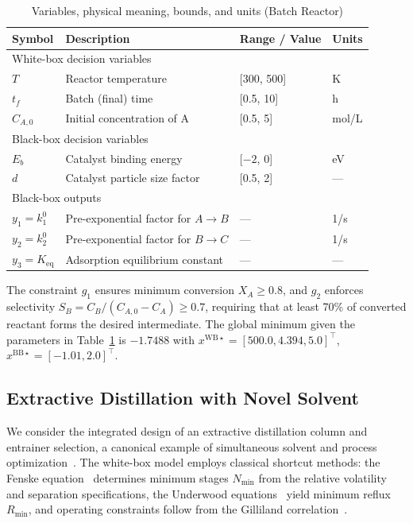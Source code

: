 \documentclass[12pt,a4paper]{article}%
\theoremstyle{plain}%
\theoremstyle{remark}%
\theoremstyle{definition}%
\def\WB{\mathrm{WB}}
\def\BB{\mathrm{BB}}
\begin{document}
\begin{appendices}
\begin{table}[htbp]
\centering
\caption{Variables, physical meaning, bounds, and units (Batch Reactor)}
\label{tab:batch_reactor_vars}
\begin{tabular}{@{}llll@{}}
\toprule
\textbf{Symbol} & \textbf{Description} & \textbf{Range / Value} & \textbf{Units} \\
\midrule
\multicolumn{4}{l}{White-box decision variables} \\
\midrule
$T$ & Reactor temperature & [300, 500] & K \\
$t_f$ & Batch (final) time & [0.5, 10] & h \\
$C_{A,0}$ & Initial concentration of A & [0.5, 5] & mol/L \\
\midrule
\multicolumn{4}{l}{Black-box decision variables} \\
\midrule
$E_b$ & Catalyst binding energy & [$-2$, 0] & eV \\
$d$ & Catalyst particle size factor & [0.5, 2] & --- \\
\midrule
\multicolumn{4}{l}{Black-box outputs} \\
\midrule
$y_1 = k_1^0$ & Pre-exponential factor for $A \to B$ & --- & 1/s \\
$y_2 = k_2^0$ & Pre-exponential factor for $B \to C$ & --- & 1/s \\
$y_3 = K_{\text{eq}}$ & Adsorption equilibrium constant & --- & --- \\
\bottomrule
\end{tabular}
\end{table}

The constraint $g_1$ ensures minimum conversion $X_A \geq 0.8$, and $g_2$ enforces selectivity $S_B = C_B/(C_{A,0} - C_A) \geq 0.7$, requiring that at least 70\% of converted reactant forms the desired intermediate. The global minimum given the parameters in Table~\ref{tab:batch_reactor_vars} is $-1.7488$ with $x^{\WB\star} = [500.0, 4.394, 5.0]^\top$, $x^{\BB\star} = [-1.01, 2.0]^\top$.

\subsection{Extractive Distillation with Novel Solvent}\label{subsec:app_distillation}

We consider the integrated design of an extractive distillation column and entrainer selection, a canonical example of simultaneous solvent and process optimization~\cite{kossack2008systematic,scheffczyk2018cosmo}. The white-box model employs classical shortcut methods: the Fenske equation~\cite{fenske1932fractionation} determines minimum stages $N_{\min}$ from the relative volatility and separation specifications, the Underwood equations~\cite{underwood1948fractional,kamath2010equation} yield minimum reflux $R_{\min}$, and operating constraints follow from the Gilliland correlation~\cite{gilliland1940multicomponent,grossmann2005optimal}.


\end{appendices}
\end{document}
